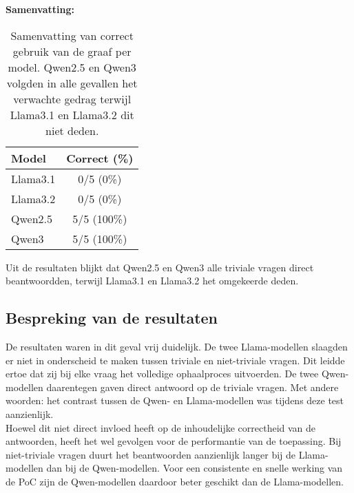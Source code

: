 \noindent\textbf{Samenvatting:}  
\begin{table}[H]
    \begin{tabular}{|l|c|}
        \hline
        \textbf{Model} & \textbf{Correct (\%)} \\
        \hline
        Llama3.1 & 0/5 (0\%) \\
        Llama3.2 & 0/5 (0\%) \\
        Qwen2.5  & 5/5 (100\%) \\
        Qwen3    & 5/5 (100\%) \\
        \hline
    \end{tabular}
    \caption{Samenvatting van correct gebruik van de graaf per model. Qwen2.5 en Qwen3 volgden in alle gevallen het verwachte gedrag terwijl Llama3.1 en Llama3.2 dit niet deden.}
\end{table}

Uit de resultaten blijkt dat Qwen2.5 en Qwen3 alle triviale vragen direct beantwoordden, terwijl Llama3.1 en Llama3.2 het omgekeerde deden.

\subsection{Bespreking van de resultaten}
De resultaten waren in dit geval vrij duidelijk. De twee Llama-modellen slaagden er niet in onderscheid te maken tussen triviale en niet-triviale vragen. Dit leidde ertoe dat zij bij elke vraag het volledige ophaalproces uitvoerden. De twee Qwen-modellen daarentegen gaven direct antwoord op de triviale vragen. Met andere woorden: het contrast tussen de Qwen- en Llama-modellen was tijdens deze test aanzienlijk.
\\[1em]
Hoewel dit niet direct invloed heeft op de inhoudelijke correctheid van de antwoorden, heeft het wel gevolgen voor de performantie van de toepassing. Bij niet-triviale vragen duurt het beantwoorden aanzienlijk langer bij de Llama-modellen dan bij de Qwen-modellen. Voor een consistente en snelle werking van de PoC zijn de Qwen-modellen daardoor beter geschikt dan de Llama-modellen.


